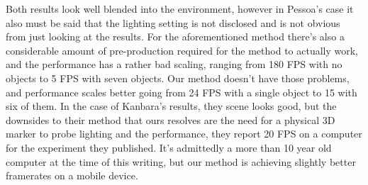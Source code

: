 Both results look well blended into the environment, however in Pessoa's case it also must be said that the lighting setting is not disclosed and is not obvious from just looking at the results. For the aforementioned method there's also a considerable amount of pre-production required for the method to actually work, and the performance has a rather bad scaling, ranging from 180 FPS with no objects to 5 FPS with seven objects. Our method doesn't have those problems, and performance scales better going from 24 FPS with a single object to 15 with six of them.\newline
In the case of Kanbara's results, they scene looks good, but the downsides to their method that ours resolves are the need for a physical 3D marker to probe lighting and the performance, they report 20 FPS on a computer for the experiment they published. It's admittedly a more than 10 year old computer at the time of this writing, but our method is achieving slightly better framerates on a mobile device.\newline
